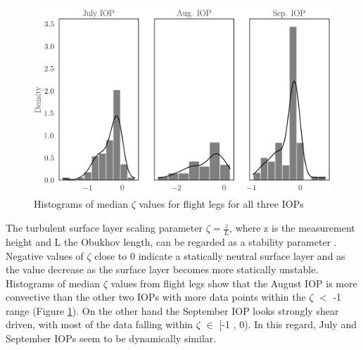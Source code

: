 \documentclass[draft]{agujournal2019}
\begin{document}
\begin{figure}[hbtp]
 \noindent\includegraphics[width=\textwidth]{zL_IOP.png}
\caption{ Histograms of median $\zeta$ values for flight legs for all three IOPs}
\label{fig:zL_IOP}
\end{figure}
The turbulent surface layer scaling parameter $\zeta = \frac{z}{L}$, where z is the measurement height and L the Obukhov length, can be regarded as a stability parameter \cite{stull_introduction_1988}. Negative values of $\zeta$ close to 0 indicate a statically neutral surface layer and as the value decrease as the surface layer becomes more statically unstable. \\
Histograms of median $\zeta$ values from flight legs show that the August IOP is more convective than the other two IOPs with more data points within the  $\zeta$ $<$ -1 range (Figure \ref{fig:zL_IOP}). On the other hand the September IOP looks strongly shear driven, with most of the data falling within $\zeta$ $\in$ [-1 , 0). In this regard, July and September IOPs seem to be dynamically similar.
\end{document}
